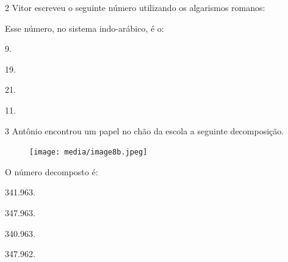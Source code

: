 \pagebreak
\num{2} Vitor escreveu o seguinte número utilizando os algarismos romanos:


Esse número, no sistema indo-arábico, é o:

\begin{escolha}
\item
  9.
\item
  19.
\item
  21.
\item
  11.
\end{escolha}

\num{3} Antônio encontrou um papel no chão da escola a seguinte decomposição.  

\begin{figure}[htpb!]
\centering
\texttt{[image: media/image8b.jpeg]}
\end{figure} 

O número decomposto é:

\begin{escolha}
\item 341.963.

\item 347.963.

\item 340.963.

\item 347.962.

\end{escolha} 

